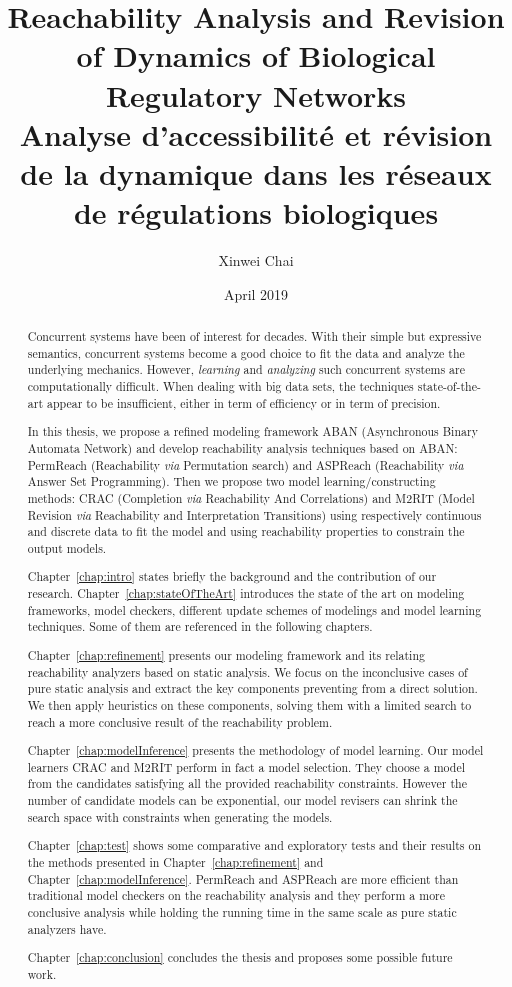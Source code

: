 \documentclass[11pt,twoside,openright]{report}
\title{Reachability Analysis and Revision of Dynamics of Biological Regulatory Networks
\\
\large Analyse d'accessibilit\'e et r\'evision de la dynamique dans les r\'eseaux de r\'egulations biologiques
}
\date{April 2019}
\author{Xinwei Chai}
\theoremstyle{definition}
\begin{document}
\maketitle
\tableofcontents
\listoffigures
\listoftables

\begin{abstract}
Concurrent systems have been of interest for decades.
With their simple but expressive semantics, concurrent systems become a good choice to fit the data and analyze the underlying mechanics.
However, \textit{learning} and \textit{analyzing} such concurrent systems are computationally difficult.
When dealing with big data sets, the techniques state-of-the-art appear to be insufficient, either in term of efficiency or in term of precision.

In this thesis, we propose a refined modeling framework ABAN (Asynchronous Binary Automata Network) and develop reachability analysis techniques based on ABAN: PermReach (Reachability \textit{via} Permutation search) and ASPReach (Reachability \textit{via} Answer Set Programming).
Then we propose two model learning/constructing methods: CRAC (Completion \textit{via} Reachability And Correlations) and M2RIT (Model Revision \textit{via} Reachability and Interpretation Transitions) using respectively continuous and discrete data to fit the model and using reachability properties to constrain the output models.

Chapter~\ref{chap:intro} states briefly the background and the contribution of our research. 
Chapter~\ref{chap:stateOfTheArt} introduces the state of the art on modeling frameworks, model checkers, different update schemes of modelings and model learning techniques.
Some of them are referenced in the following chapters.

Chapter~\ref{chap:refinement} presents our modeling framework and its relating reachability analyzers based on static analysis.
We focus on the inconclusive cases of pure static analysis and extract the key components preventing from a direct solution.
We then apply heuristics on these components, solving them with a limited search to reach a more conclusive result of the reachability problem.

Chapter~\ref{chap:modelInference} presents the methodology of model learning.
Our model learners CRAC and M2RIT perform in fact a model selection. 
They choose a model from the candidates satisfying all the provided reachability constraints.
However the number of candidate models can be exponential, our model revisers can shrink the search space with constraints when generating the models.

Chapter~\ref{chap:test} shows some comparative and exploratory tests and their results on the methods presented in Chapter~\ref{chap:refinement} and Chapter~\ref{chap:modelInference}.
PermReach and ASPReach are more efficient than traditional model checkers on the reachability analysis and they perform a more conclusive analysis while holding the running time in the same scale as pure static analyzers have.

Chapter~\ref{chap:conclusion} concludes the thesis and proposes some possible future work.
\end{abstract}
\end{document}
